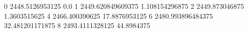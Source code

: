 0 2448.5126953125 0.0
1 2449.620849609375 1.108154296875
2 2449.873046875 1.3603515625
4 2466.400390625 17.8876953125
6 2480.993896484375 32.481201171875
8 2493.4111328125 44.8984375
